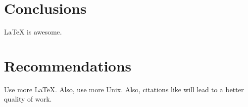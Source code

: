 \documentclass{workreport}
\begin{document}
\begin{body}
\section{Conclusions}

	\gls{LaTeX} is awesome.

\section{Recommendations}

	Use more \LaTeX. Also, use more \gls{Unix}. Also, citations like
    	\cite{k_townsend_ble} will lead to a better quality of work.

\end{body}



\end{document}

